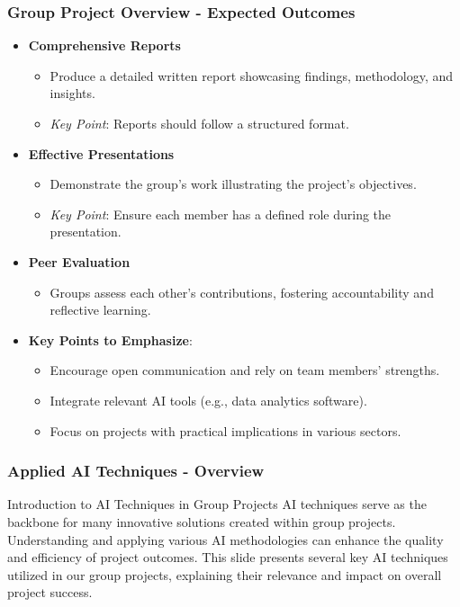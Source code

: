 \documentclass[aspectratio=169]{beamer}
\begin{document}
\begin{frame}[fragile]
    \frametitle{Group Project Overview - Expected Outcomes}
    \begin{itemize}
        \item \textbf{Comprehensive Reports}
            \begin{itemize}
                \item Produce a detailed written report showcasing findings, methodology, and insights.
                \item \textit{Key Point}: Reports should follow a structured format.
            \end{itemize}

        \item \textbf{Effective Presentations}
            \begin{itemize}
                \item Demonstrate the group’s work illustrating the project’s objectives.
                \item \textit{Key Point}: Ensure each member has a defined role during the presentation.
            \end{itemize}

        \item \textbf{Peer Evaluation}
            \begin{itemize}
                \item Groups assess each other's contributions, fostering accountability and reflective learning.
            \end{itemize}

        \item \textbf{Key Points to Emphasize}:
            \begin{itemize}
                \item Encourage open communication and rely on team members' strengths.
                \item Integrate relevant AI tools (e.g., data analytics software).
                \item Focus on projects with practical implications in various sectors.
            \end{itemize}
    \end{itemize}
\end{frame}

\begin{frame}[fragile]
    \frametitle{Applied AI Techniques - Overview}
    \begin{block}{Introduction to AI Techniques in Group Projects}
        AI techniques serve as the backbone for many innovative solutions created within group projects. Understanding and applying various AI methodologies can enhance the quality and efficiency of project outcomes. This slide presents several key AI techniques utilized in our group projects, explaining their relevance and impact on overall project success.
    \end{block}
\end{frame}
\end{document}
